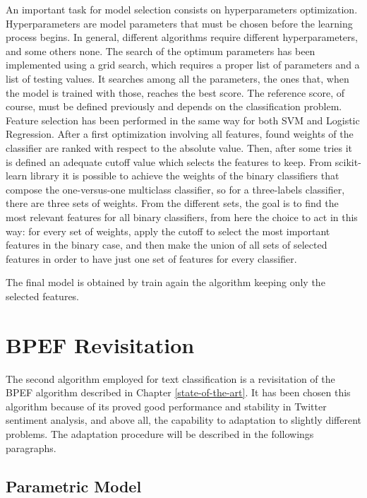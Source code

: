 An important task for model selection consists on hyperparameters optimization. Hyperparameters are model parameters that must be chosen before the learning process begins. In general, different algorithms require different hyperparameters, and some others none. The search of the optimum parameters has been implemented using a grid search, which requires a proper list of parameters and a list of testing values. It searches among all the parameters, the ones that, when the model is trained with those, reaches the best score. The reference score, of course, must be defined previously and depends on the classification problem.
Feature selection has been performed in the same way for both SVM and Logistic Regression. After a first optimization involving all features, found weights of the classifier are ranked with respect to the absolute value. Then, after some tries it is defined an adequate cutoff value which selects the features to keep. From scikit-learn library it is possible to achieve the weights of the binary classifiers that compose the one-versus-one multiclass classifier, so for a three-labels classifier, there are three sets of weights. From the different sets, the goal is to find the most relevant features for all binary classifiers, from here the choice to act in this way: for every set of weights, apply the cutoff to select the most important features in the binary case, and then make the union of all sets of selected features in order to have just one set of features for every classifier.



 The final model is obtained by train again the algorithm keeping only the selected features.


\section{BPEF Revisitation}

The second algorithm employed for text classification is a revisitation of the BPEF algorithm described in Chapter \ref{state-of-the-art}. It has been chosen this algorithm because of its proved good performance and stability in Twitter sentiment analysis, and above all, the capability to adaptation to slightly different problems. The adaptation procedure will be described in the followings paragraphs.

\subsection{Parametric Model}

